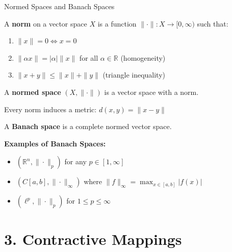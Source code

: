 \documentclass[aspectratio=169,10pt]{beamer}
\begin{document}
\begin{frame}{Normed Spaces and Banach Spaces}
    \begin{definition}
        A \textbf{norm} on a vector space $X$ is a function $\|\cdot\|: X \to [0, \infty)$ such that:
        \begin{enumerate}
            \item $\|x\| = 0 \Leftrightarrow x = 0$
            \item $\|\alpha x\| = |\alpha| \|x\|$ for all $\alpha \in \mathbb{R}$ (homogeneity)
            \item $\|x + y\| \leq \|x\| + \|y\|$ (triangle inequality)
        \end{enumerate}
        A \textbf{normed space} $(X, \|\cdot\|)$ is a vector space with a norm.
    \end{definition}

    \vspace{0.3cm}
    Every norm induces a metric: $d(x,y) = \|x - y\|$

    \vspace{0.4cm}
    \begin{definition}
        A \textbf{Banach space} is a complete normed vector space.
    \end{definition}

    \vspace{0.3cm}
    \textbf{Examples of Banach Spaces:}
    \begin{itemize}
        \item $(\mathbb{R}^n, \|\cdot\|_p)$ for any $p \in [1, \infty]$
        \item $(C[a,b], \|\cdot\|_\infty)$ where $\|f\|_\infty = \max_{x \in [a,b]} |f(x)|$
        \item $(\ell^p, \|\cdot\|_p)$ for $1 \leq p \leq \infty$
    \end{itemize}
\end{frame}

\section{3. Contractive Mappings}
\end{document}

